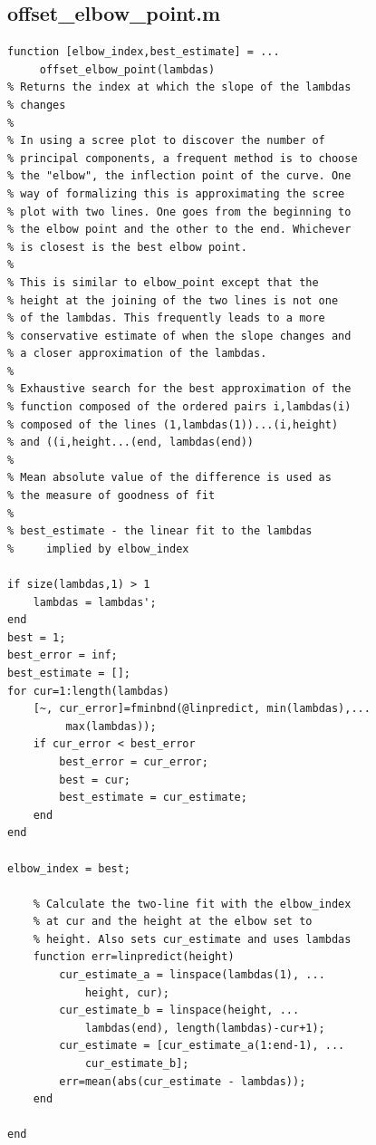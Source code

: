 \documentclass[10pt,letterpaper]{book}
\begin{document}
\subsection{offset\_elbow\_point.m}
\begin{lstlisting}
function [elbow_index,best_estimate] = ...
     offset_elbow_point(lambdas)
% Returns the index at which the slope of the lambdas 
% changes
%
% In using a scree plot to discover the number of 
% principal components, a frequent method is to choose
% the "elbow", the inflection point of the curve. One
% way of formalizing this is approximating the scree 
% plot with two lines. One goes from the beginning to
% the elbow point and the other to the end. Whichever
% is closest is the best elbow point.
%
% This is similar to elbow_point except that the
% height at the joining of the two lines is not one
% of the lambdas. This frequently leads to a more
% conservative estimate of when the slope changes and
% a closer approximation of the lambdas.
%
% Exhaustive search for the best approximation of the
% function composed of the ordered pairs i,lambdas(i) 
% composed of the lines (1,lambdas(1))...(i,height)
% and ((i,height...(end, lambdas(end))
%
% Mean absolute value of the difference is used as
% the measure of goodness of fit
%
% best_estimate - the linear fit to the lambdas
%     implied by elbow_index

if size(lambdas,1) > 1
    lambdas = lambdas';
end
best = 1;
best_error = inf;
best_estimate = [];
for cur=1:length(lambdas)
    [~, cur_error]=fminbnd(@linpredict, min(lambdas),...
         max(lambdas));
    if cur_error < best_error
        best_error = cur_error;
        best = cur;
        best_estimate = cur_estimate;
    end
end

elbow_index = best;

    % Calculate the two-line fit with the elbow_index
    % at cur and the height at the elbow set to
    % height. Also sets cur_estimate and uses lambdas
    function err=linpredict(height)
        cur_estimate_a = linspace(lambdas(1), ...
            height, cur);
        cur_estimate_b = linspace(height, ...
            lambdas(end), length(lambdas)-cur+1);
        cur_estimate = [cur_estimate_a(1:end-1), ...
            cur_estimate_b];
        err=mean(abs(cur_estimate - lambdas));
    end

end
\end{lstlisting}
\end{document}

